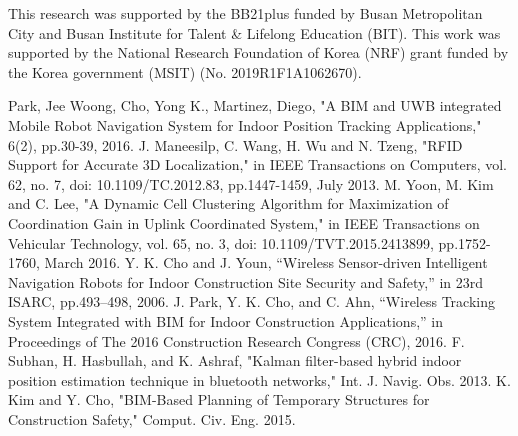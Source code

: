 \documentclass[conference]{IEEEtran}
\begin{document}
This research was supported by the BB21plus funded by Busan Metropolitan City and Busan Institute for Talent \& Lifelong Education (BIT).
This work was supported by the National Research Foundation of Korea (NRF) grant funded by the Korea government (MSIT) (No. 2019R1F1A1062670).

\begin{thebibliography}{00}
     Park, Jee Woong, Cho, Yong K., Martinez, Diego, "A BIM and UWB integrated Mobile Robot Navigation System for Indoor Position Tracking Applications," 6(2), pp.30-39, 2016.
     J. Maneesilp, C. Wang, H. Wu and N. Tzeng, "RFID Support for Accurate 3D Localization," in IEEE Transactions on Computers, vol. 62, no. 7, doi: 10.1109/TC.2012.83, pp.1447-1459, July 2013.
     M. Yoon, M. Kim and C. Lee, "A Dynamic Cell Clustering Algorithm for Maximization of Coordination Gain in Uplink Coordinated System," in IEEE Transactions on Vehicular Technology, vol. 65, no. 3, doi: 10.1109/TVT.2015.2413899, pp.1752-1760, March 2016.
     Y. K. Cho and J. Youn, “Wireless Sensor-driven Intelligent Navigation Robots for Indoor Construction Site Security and Safety,” in 23rd ISARC, pp.493–498, 2006.
     J. Park, Y. K. Cho, and C. Ahn, “Wireless Tracking System Integrated with BIM for Indoor Construction Applications,” in Proceedings of The 2016 Construction Research Congress (CRC), 2016.
     F. Subhan, H. Hasbullah, and K. Ashraf, "Kalman filter-based hybrid indoor position estimation technique in bluetooth networks," Int. J. Navig. Obs. 2013.
     K. Kim and Y. Cho, "BIM-Based Planning of Temporary Structures for Construction Safety," Comput. Civ. Eng. 2015.

\end{thebibliography}
\end{document}
